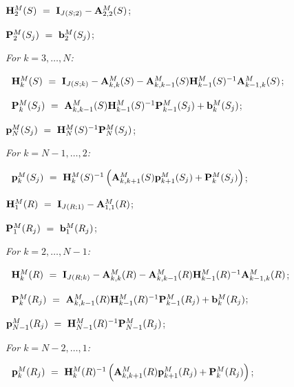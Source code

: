 \documentclass[10pt,A4paper]{article}
\begin{document}
\vspace{0.5cm}
\par {}
\begin{description}
  \item ${\bf H}^M_2(S) ~=~ {\bf I}_{J(S;2)}-{\bf A}^M_{2,2}(S)$;
  \item ${\bf P}^M_2(S_j) ~=~ {\bf b}^M_2(S_j)$;
  \item \it For $k=3,\dots,N$:
  \item $~$\hspace{0.5cm} ${\bf H}^M_k(S) ~=~ {\bf I}_{J(S;k)}-{\bf A}^M_{k,k}(S)-{\bf A}^M_{k,k-1}(S){\bf H}^M_{k-1}(S)^{-1}{\bf A}^M_{k-1,k}(S)$;
  \item $~$\hspace{0.5cm} ${\bf P}^M_k(S_j) ~=~ {\bf A}^M_{k,k-1}(S){\bf H}^M_{k-1}(S)^{-1}{\bf P}^M_{k-1}(S_j)+{\bf b}^M_k(S_j)$;
  \item ${\bf p}^M_N(S_j) ~=~ {\bf H}^M_N(S)^{-1}{\bf P}^M_N(S_j)$;
  \item \it For $k=N-1,\dots,2$:
  \item $~$\hspace{0.5cm} ${\bf p}^M_k(S_j) ~=~ {\bf H}^M_k(S)^{-1}\left({\bf A}^M_{k,k+1}(S){\bf p}^M_{k+1}(S_j)+{\bf P}^M_k(S_j)\right)$;
\end{description}
\vspace{0.5cm}

\vspace{0.5cm}
\par {}
\begin{description}
  \item ${\bf H}^M_1(R) ~=~ {\bf I}_{J(R;1)}-{\bf A}^M_{1,1}(R)$;
  \item ${\bf P}^M_1(R_j) ~=~ {\bf b}^M_1(R_j)$;
  \item \it For $k=2,\dots,N-1$:
  \item $~$\hspace{0.5cm} ${\bf H}^M_k(R) ~=~ {\bf I}_{J(R;k)}-{\bf A}^M_{k,k}(R)-{\bf A}^M_{k,k-1}(R){\bf H}^M_{k-1}(R)^{-1}{\bf A}^M_{k-1,k}(R)$;
  \item $~$\hspace{0.5cm} ${\bf P}^M_k(R_j) ~=~ {\bf A}^M_{k,k-1}(R){\bf H}^M_{k-1}(R)^{-1}{\bf P}^M_{k-1}(R_j)+{\bf b}^M_k(R_j)$;
  \item ${\bf p}^M_{N-1}(R_j) ~=~ {\bf H}^M_{N-1}(R)^{-1}{\bf P}^M_{N-1}(R_j)$;
  \item \it For $k=N-2,\dots,1$:
  \item $~$\hspace{0.5cm} ${\bf p}^M_k(R_j) ~=~ {\bf H}^M_k(R)^{-1}\left({\bf A}^M_{k,k+1}(R){\bf p}^M_{k+1}(R_j)+{\bf P}^M_k(R_j)\right)$;
\end{description}
\vspace{0.5cm}
\end{document}

